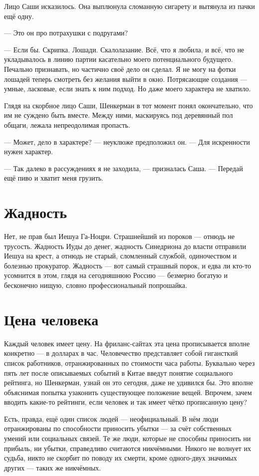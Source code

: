 \documentclass[a4paper,10pt,fleqn]{book}\usepackage{polyglossia}\setdefaultlanguage{english}\setotherlanguage{russian}\defaultfontfeatures{Ligatures=TeX,Mapping=tex-text} \usepackage{xcolor}\definecolor{lightgray}{HTML}{bbbbbb}\color{lightgray}\newcommand{\ml}[3]{\textcolor{black}{#3}}
\begin{document}
Лицо Саши исказилось.
Она выплюнула сломанную сигарету и вытянула из пачки ещё одну.

--- Это он про потрахушки с подругами?

--- Если бы.
Скрипка.
Лошади.
Скалолазание.
Всё, что я любила, и всё, что не укладывалось в линию партии касательно моего потенциального будущего.
Печально признавать, но частично своё дело он сделал.
Я не могу на фотки лошадей теперь смотреть без желания выйти в окно.
Потрясающие создания --- умные, ласковые, если знать к ним подход.
Но даже моего характера не хватило.

Глядя на скорбное лицо Саши, Шенкерман в тот момент понял окончательно, что им не суждено быть вместе.
Между ними, маскируясь под деревянный пол общаги, лежала непреодолимая пропасть.

--- Может, дело в характере? --- неуклюже предположил он.
--- Для искренности нужен характер.

--- Так далеко в рассуждениях я не заходила, --- призналась Саша.
--- Передай ещё пиво и хватит меня грузить.

\section{Жадность}

Нет, не прав был Иешуа Га-Ноцри.
Страшнейший из пороков --- отнюдь не трусость.
Жадность Иуды до денег, жадность Синедриона до власти отправили Иешуа на крест, а отнюдь не старый, сломленный службой, одиночеством и болезнью прокуратор.
Жадность --- вот самый страшный порок, и едва ли кто-то усомнится в этом, глядя на сегодняшнюю Россию --- безмерно богатую и бесконечно нищую, словно профессиональный попрошайка.

\section{Цена человека}

Каждый человек имеет цену.
На фриланс-сайтах эта цена прописывается вполне конкретно --- в долларах в час.
Человечество представляет собой гигансткий список работников, отранжированных по стоимости часа работы.
Буквально через пять лет после описываемых событий в Китае введут понятие социального рейтинга, но Шенкерман, узнай он это сегодня, даже не удивился бы.
Это вполне объяснимая попытка узаконить существующее положение вещей.
Впрочем, зачем вводить какие-то рейтинги, если человек и так имеет чётко прописанную цену?

Есть, правда, ещё один список людей --- неофициальный.
В нём люди отранжированы по способности приносить убытки --- за счёт собственных умений или социальных связей.
Те же люди, которые не способны приносить ни прибыль, ни убытки, справедливо считаются никчёмными.
Никого не волнует их судьба, никто не скорбит по поводу их смерти, кроме одного-двух значимых других --- таких же никчёмных.
\end{document}
